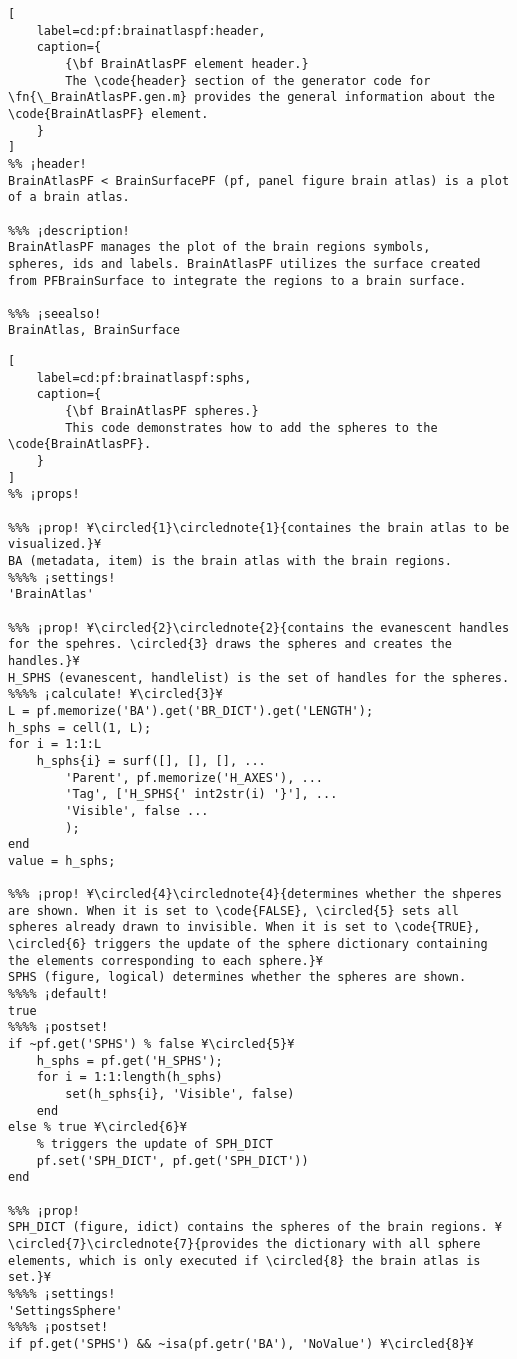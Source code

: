 \documentclass{tufte-handout}
\begin{document}
\begin{lstlisting}[
	label=cd:pf:brainatlaspf:header,
	caption={
		{\bf BrainAtlasPF element header.}
		The \code{header} section of the generator code for \fn{\_BrainAtlasPF.gen.m} provides the general information about the \code{BrainAtlasPF} element.
	}
]
%% ¡header!
BrainAtlasPF < BrainSurfacePF (pf, panel figure brain atlas) is a plot of a brain atlas.

%%% ¡description!
BrainAtlasPF manages the plot of the brain regions symbols,
spheres, ids and labels. BrainAtlasPF utilizes the surface created
from PFBrainSurface to integrate the regions to a brain surface.

%%% ¡seealso!
BrainAtlas, BrainSurface
\end{lstlisting}

\begin{lstlisting}[
	label=cd:pf:brainatlaspf:sphs,
	caption={
		{\bf BrainAtlasPF spheres.}
		This code demonstrates how to add the spheres to the \code{BrainAtlasPF}.
	}
]
%% ¡props!

%%% ¡prop! ¥\circled{1}\circlednote{1}{containes the brain atlas to be visualized.}¥
BA (metadata, item) is the brain atlas with the brain regions.
%%%% ¡settings!
'BrainAtlas'

%%% ¡prop! ¥\circled{2}\circlednote{2}{contains the evanescent handles for the spehres. \circled{3} draws the spheres and creates the handles.}¥
H_SPHS (evanescent, handlelist) is the set of handles for the spheres.
%%%% ¡calculate! ¥\circled{3}¥
L = pf.memorize('BA').get('BR_DICT').get('LENGTH');
h_sphs = cell(1, L);
for i = 1:1:L
    h_sphs{i} = surf([], [], [], ...
        'Parent', pf.memorize('H_AXES'), ...
        'Tag', ['H_SPHS{' int2str(i) '}'], ...
        'Visible', false ...
        );
end
value = h_sphs;

%%% ¡prop! ¥\circled{4}\circlednote{4}{determines whether the shperes are shown. When it is set to \code{FALSE}, \circled{5} sets all spheres already drawn to invisible. When it is set to \code{TRUE}, \circled{6} triggers the update of the sphere dictionary containing the elements corresponding to each sphere.}¥
SPHS (figure, logical) determines whether the spheres are shown.
%%%% ¡default!
true
%%%% ¡postset!
if ~pf.get('SPHS') % false ¥\circled{5}¥
    h_sphs = pf.get('H_SPHS');
    for i = 1:1:length(h_sphs)
        set(h_sphs{i}, 'Visible', false)
    end
else % true ¥\circled{6}¥
    % triggers the update of SPH_DICT
    pf.set('SPH_DICT', pf.get('SPH_DICT'))
end

%%% ¡prop!
SPH_DICT (figure, idict) contains the spheres of the brain regions. ¥\circled{7}\circlednote{7}{provides the dictionary with all sphere elements, which is only executed if \circled{8} the brain atlas is set.}¥
%%%% ¡settings!
'SettingsSphere'
%%%% ¡postset!
if pf.get('SPHS') && ~isa(pf.getr('BA'), 'NoValue') ¥\circled{8}¥
    

\end{lstlisting}
\end{document}

